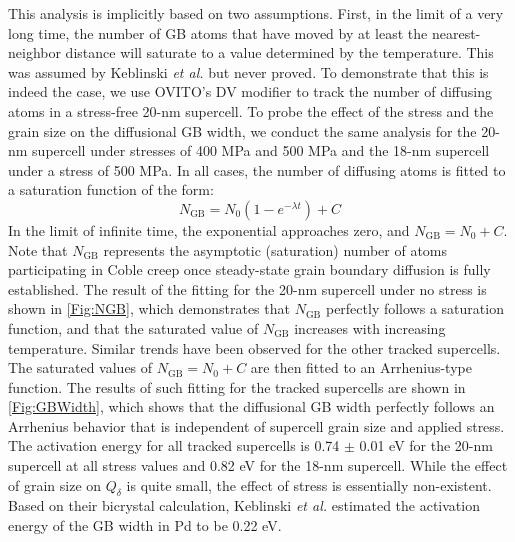 \documentclass[preprint,12pt,sort&compress]{elsarticle}
\newcommand{\?}{\stackrel{?}{=}}
\begin{document}
This analysis is implicitly based on two assumptions. First, in the limit of a very long time, the number of GB atoms that have moved by at least the nearest-neighbor distance will saturate to a value determined by the temperature. This was assumed by Keblinski \textit{et al.} \cite{Keblinski1999} but never proved. To demonstrate that this is indeed the case, we use OVITO's DV modifier to track the number of diffusing atoms in a stress-free 20-nm supercell. To probe the effect of the stress and the grain size on the diffusional GB width, we conduct the same analysis for the 20-nm supercell under stresses of 400 MPa and 500 MPa and the 18-nm supercell under a stress of 500 MPa. In all cases, the number of diffusing atoms is fitted to a saturation function of the form:
\begin{equation}
N_\mathrm{GB} = N_0 \left( 1- e^{- \lambda t} \right) + C
\end{equation}
In the limit of infinite time, the exponential approaches zero, and $N_\mathrm{GB} = N_0 + C$. Note that $N_\text{GB}$ represents the asymptotic (saturation) number of atoms participating in Coble creep once steady-state grain boundary diffusion is fully established. The result of the fitting for the 20-nm supercell under no stress is shown in \cref{Fig:NGB}, which demonstrates that $N_{\mathrm{GB}}$ perfectly follows a saturation function, and that the saturated value of $N_{\mathrm{GB}}$ increases with increasing temperature. Similar trends have been observed for the other tracked supercells. The saturated values of $N_\mathrm{GB} = N_0 + C$ are then fitted to an Arrhenius-type function. The results of such fitting for the tracked supercells are shown in \cref{Fig:GBWidth}, which shows that the diffusional GB width perfectly follows an Arrhenius behavior that is independent of supercell grain size and applied stress. The activation energy for all tracked supercells is 0.74 $\pm$ 0.01 eV for the 20-nm supercell at all stress values and 0.82 eV for the 18-nm supercell. While the effect of grain size on $Q_\delta$ is quite small, the effect of stress is essentially non-existent. Based on their bicrystal calculation, Keblinski \textit{et al.} \cite{Keblinski1999} estimated the activation energy of the GB width in Pd to be 0.22 eV.
\end{document}
